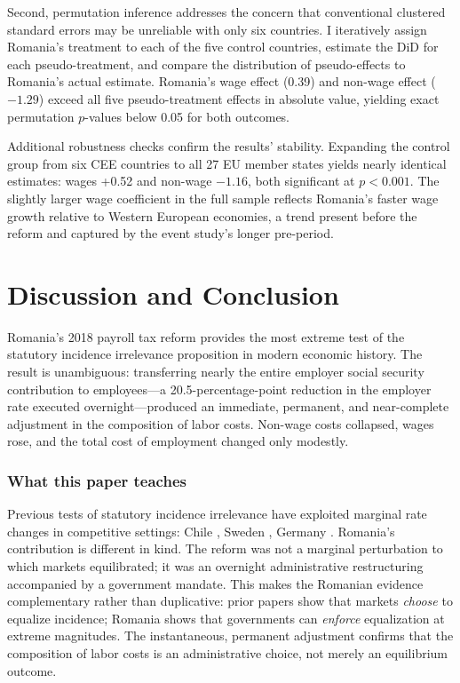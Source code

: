 \documentclass[12pt]{article}
\begin{document}
Second, permutation inference addresses the concern that conventional clustered standard errors may be unreliable with only six countries. I iteratively assign Romania's treatment to each of the five control countries, estimate the DiD for each pseudo-treatment, and compare the distribution of pseudo-effects to Romania's actual estimate. Romania's wage effect (0.39) and non-wage effect ($-1.29$) exceed all five pseudo-treatment effects in absolute value, yielding exact permutation $p$-values below 0.05 for both outcomes.

Additional robustness checks confirm the results' stability. Expanding the control group from six CEE countries to all 27 EU member states yields nearly identical estimates: wages +0.52 and non-wage $-1.16$, both significant at $p < 0.001$. The slightly larger wage coefficient in the full sample reflects Romania's faster wage growth relative to Western European economies, a trend present before the reform and captured by the event study's longer pre-period.




\section{Discussion and Conclusion}

Romania's 2018 payroll tax reform provides the most extreme test of the statutory incidence irrelevance proposition in modern economic history. The result is unambiguous: transferring nearly the entire employer social security contribution to employees---a 20.5-percentage-point reduction in the employer rate executed overnight---produced an immediate, permanent, and near-complete adjustment in the composition of labor costs. Non-wage costs collapsed, wages rose, and the total cost of employment changed only modestly.

\subsubsection*{What this paper teaches} Previous tests of statutory incidence irrelevance have exploited marginal rate changes in competitive settings: Chile \citep{gruber1997incidence}, Sweden \citep{saez2019payroll}, Germany \citep{anderson2013incidence}. Romania's contribution is different in kind. The reform was not a marginal perturbation to which markets equilibrated; it was an overnight administrative restructuring accompanied by a government mandate. This makes the Romanian evidence complementary rather than duplicative: prior papers show that markets \emph{choose} to equalize incidence; Romania shows that governments can \emph{enforce} equalization at extreme magnitudes. The instantaneous, permanent adjustment confirms that the composition of labor costs is an administrative choice, not merely an equilibrium outcome.
\end{document}
